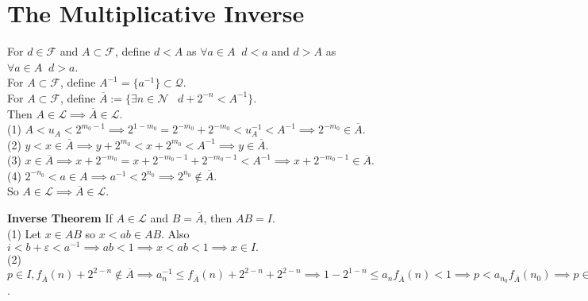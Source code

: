\documentclass[10pt]{article}
\newcommand{\rationals}{ \mathscr{Q}}
\newcommand{\ladders}{ \mathscr{L}}
\newcommand{\dyadics}{ \mathscr{F}}
\newcommand{\naturals}{ \mathscr{N}}
\newcommand{\invmark}{\overline}
\begin{document}
\bigbreak
\bigbreak
\bigbreak
\bigbreak
\bigbreak
\bigbreak
\bigbreak
\bigbreak
\bigbreak
\bigbreak
\bigbreak
\bigbreak
\bigbreak
\bigbreak
\bigbreak
\bigbreak
\bigbreak
\section{The Multiplicative Inverse}


For $d \in \dyadics$ and $A \subset \dyadics$, define $d < A $ as $  \forall a \in A \;\;  d < a$ and $d > A$ as $ \forall a \in A \;\;  d > a$.\\

For $A \subset \dyadics$, define $A^{-1} = \{ a^{-1} \}\subset \rationals$.\\

For $A \subset \dyadics$, define $\invmark A := \{\exists n \in \naturals \;\;\; d + 2^{-n} < A^{-1}\}$.\\

Then $A \in \ladders \implies \invmark A \in \ladders.$\\

(1) $A < u_A < 2^{m_0-1} \implies 2^{1-m_0} = 2^{-m_0} + 2^{-m_0} < u_A^{-1} < A^{-1} \implies 2^{-m_0} \in \invmark A$.\\
(2) $y < x \in \invmark A \implies y + 2^{m_0} < x + 2^{m_0} < A^{-1} \implies y \in \invmark A$.\\
(3) $x \in \invmark A \implies x + 2^{-m_0} = x + 2^{-m_0-1} + 2^{-m_0-1} < A^{-1} \implies x + 2^{-m_0-1} \in \invmark A$.\\
(4) $2^{-n_0} < a \in A \implies a^{-1} < 2^{n_0} \implies 2^{n_0} \notin \invmark A$.\\

So $A \in \ladders \implies \invmark A \in \ladders$.\\



\bigbreak
\bigbreak
\bigbreak

\textbf{Inverse Theorem} \;\; If $A \in \ladders$ and $B = \invmark A$, then $AB = I.$ \\

(1) Let $x \in AB$ so $x < ab \in AB$. Also $i < b + \varepsilon < a^{-1} \implies ab < 1 \implies x < ab < 1 \implies x \in I.$\\ 
(2) $p \in I, f_{\invmark A}(n) +2^{2-n} \notin {\invmark A} \implies a_n^{-1} \le f_{\invmark A}(n) +2^{2-n} +2^{2-n} \implies 1 - 2^{1-n} \le a_n f_{\invmark A}(n) < 1 \implies p < a_{n_0} f_{\invmark A}(n_0) \implies p \in A{\invmark A}$.\\
\end{document}
